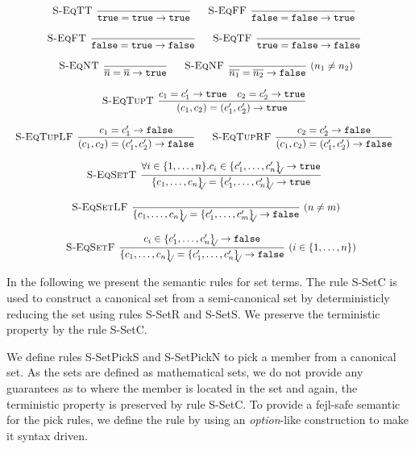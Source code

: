 \documentclass[a4paper]{article}
\newcommand{\s}[1]{\mathtt{#1}}
\newcommand{\sLb}{\s{\{}}
\newcommand{\sRb}{\s{\}}}
\newcommand{\strue}{\s{true}}
\newcommand{\sfalse}{\s{false}}
\newcommand{\sset}[1]{\sLb #1 \sRb}
\newcommand{\ssetc}[1]{\sset{#1}_{\!\!\!\surd}}
\newcommand{\step}{\to}
\renewcommand{\rule}[3][]{\ \mbox{\textsc{#1 }}\dfrac{#2}{#3}\ }
\begin{document}
\[\begin{array}{c}
\rule[S-EqTT]{}{\strue = \strue \step \strue}
\quad
\rule[S-EqFF]{}{\sfalse = \sfalse \step \strue}
\quad\\\\
\rule[S-EqFT]{}{\sfalse = \strue \step \sfalse}
\quad
\rule[S-EqTF]{}{\strue = \sfalse \step \sfalse}
\quad\\\\
\rule[S-EqNT]{}{\overline{n} = \overline{n} \step \strue}
\quad
\rule[S-EqNF]{}{\overline{n_1} = \overline{n_2} \step \sfalse} (n_1 \neq n_2)
\quad\\\\
\rule[S-EqTupT]{c_1 = c_1' \step \strue \quad c_2 = c_2' \step \strue}
  {(c_1, c_2) = (c_1', c_2') \step \strue}
\quad\\\\
\rule[S-EqTupLF]{c_1 = c_1' \step \sfalse}
  {(c_1, c_2) = (c_1', c_2') \step \sfalse}
\quad
\rule[S-EqTupRF]{c_2 = c_2' \step \sfalse}
  {(c_1, c_2) = (c_1', c_2') \step \sfalse}
\quad\\\\
\rule[S-EqSetT]{\forall i \in \{1,\ldots,n\}. c_i \in  \ssetc{c'_1,\ldots,c'_n} \step \strue}
  {\ssetc{c_1,\ldots,c_n} = \ssetc{c'_1,\ldots,c'_n} \step \strue}
\quad\\\\
\rule[S-EqSetLF]{}{\ssetc{c_1,\ldots,c_n} = \ssetc{c'_1,\ldots,c'_m} \step \sfalse}(n \neq m)
\quad\\\\
\rule[S-EqSetF]{c_i \in \ssetc{c'_1,\ldots,c'_n} \step \sfalse}
  {\ssetc{c_1,\ldots,c_n} = \ssetc{c'_1,\ldots,c'_n} \step \sfalse}(i \in \{1,\ldots,n\})
\end{array}\]

In the following we present the semantic rules for set terms. The rule S-SetC is used to construct a canonical set from a semi-canonical set by deterministicly reducing the set using rules S-SetR and S-SetS. We preserve the terministic property by the rule S-SetC.

We define rules S-SetPickS and S-SetPickN to pick a member from a canonical set. As the sets are defined as mathematical sets, we do not provide any guarantees as to where the member is located in the set and again, the terministic property is preserved by rule S-SetC. To provide a fejl-safe semantic for the pick rules, we define the rule by using an \emph{option}-like construction to make it syntax driven.
\end{document}
